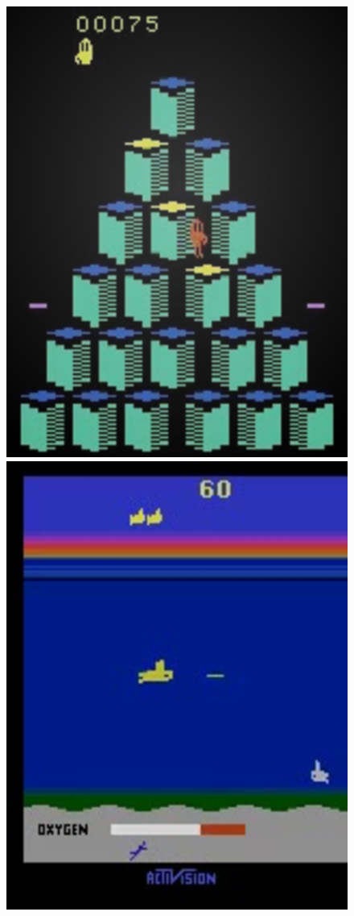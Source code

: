 \documentclass[final]{beamer}
\newlength{\onecolwid}
\begin{document}
\begin{frame}[t]
\begin{columns}[t]
\begin{column}{\onecolwid}

\begin{figure}[h]
    \begin{minipage}{0.8\textwidth}
        \centering
        \includegraphics[scale=0.5]{Qbert}
        \centering
        \includegraphics[scale=0.5]{Seaquest}

\end{minipage}
\end{figure}
\end{column}
\end{columns}
\end{frame}
\end{document}
